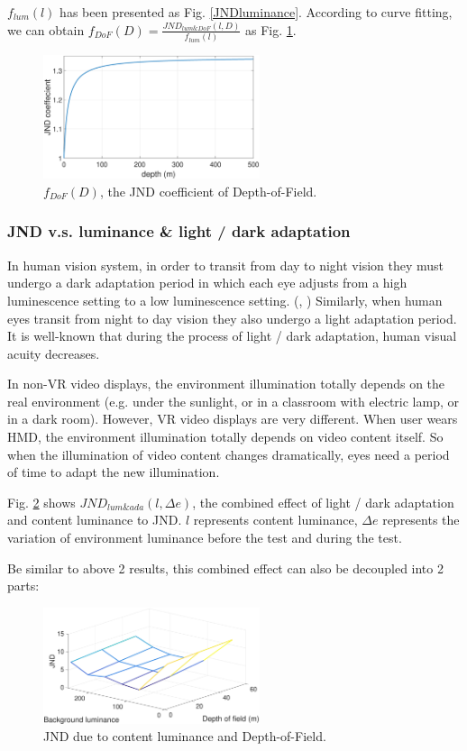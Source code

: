 $f_{lum}(l)$ has been presented as Fig. \ref{JNDluminance}. According to curve fitting, we can obtain $f_{DoF}(D) = \frac{JND_{lum\&DoF}(l, D)}{f_{lum}(l)}$ as Fig. \ref{JNDdof}.

\begin{figure}
  \centering
  \includegraphics[width=2.5in]{images/JNDdof.eps}
  \caption{$f_{DoF}(D)$, the JND coefficient of Depth-of-Field.}
  \label{JNDdof}
  \end{figure}

\subsubsection{JND v.s. luminance \& light / dark adaptation}

In human vision system, in order to transit from day to night vision they must undergo a dark adaptation period in which each eye adjusts from a high luminescence setting to a low luminescence setting. (\cite{darkadaptation}, \cite{darkadaptation2}) Similarly, when human eyes transit from night to day vision they also undergo a light adaptation period. It is well-known that during the process of light / dark adaptation, human visual acuity decreases.

In non-VR video displays, the environment illumination totally depends on the real environment (e.g. under the sunlight, or in a classroom with electric lamp, or in a dark room). However, VR video displays are very different. When user wears HMD, the environment illumination totally depends on video content itself. So when the illumination of video content changes dramatically, eyes need a period of time to adapt the new illumination.

Fig. \ref{JNDadapt-lum} shows $JND_{lum\&ada}(l, \Delta e)$, the combined effect of light / dark adaptation and content luminance to JND. $l$ represents content luminance, $\Delta e$ represents the variation of environment luminance before the test and during the test. 

Be similar to above 2 results, this combined effect can also be decoupled into 2 parts:

\begin{figure}
  \centering
  \includegraphics[width=2.5in]{images/JNDdof-lum.eps}
  \caption{JND due to content luminance and Depth-of-Field.}
  \label{JNDadapt-lum}
  \end{figure}

